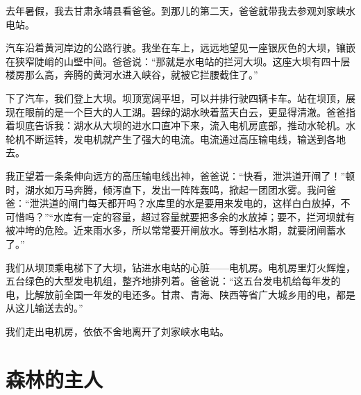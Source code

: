 \documentclass[12pt,UTF-8,openany]{ctexbook}
\begin{document}
\begin{large}
    
    去年暑假，我去甘肃永靖县看爸爸。到那儿的第二天，爸爸就带我去参观刘家峡水电站。
    
    汽车沿着黄河岸边的公路行驶。我坐在车上，远远地望见一座银灰色的大坝，镶嵌在狭窄陡峭的山壁中间。爸爸说：“那就是水电站的拦河大坝。这座大坝有四十层楼房那么高，奔腾的黄河水进入峡谷，就被它拦腰截住了。”
    
    下了汽车，我们登上大坝。坝顶宽阔平坦，可以并排行驶四辆卡车。站在坝顶，展现在眼前的是一个巨大的人工湖。碧绿的湖水映着蓝天白云，更显得清澈。爸爸指着坝底告诉我：湖水从大坝的进水口直冲下来，流入电机房底部，推动水轮机。水轮机不断运转，发电机就产生了强大的电流。电流通过高压输电线，输送到各地去。
    
    我正望着一条条伸向远方的高压输电线出神，爸爸说：“快看，泄洪道开闸了！”顿时，湖水如万马奔腾，倾泻直下，发出一阵阵轰鸣，掀起一团团水雾。我问爸爸：“泄洪道的闸门每天都开吗？水库里的水是要用来发电的，这样白白放掉，不可惜吗？”“水库有一定的容量，超过容量就要把多余的水放掉；要不，拦河坝就有被冲垮的危险。近来雨水多，所以常常要开闸放水。等到枯水期，就要闭闸蓄水了。”
    
    我们从坝顶乘电梯下了大坝，钻进水电站的心脏——电机房。电机房里灯火辉煌，五台绿色的大型发电机组，整齐地排列着。爸爸说：“这五台发电机给每年发的电，比解放前全国一年发的电还多。甘肃、青海、陕西等省广大城乡用的电，都是从这儿输送去的。”
    
    我们走出电机房，依依不舍地离开了刘家峡水电站。
    
\end{large}



\chapter{森林的主人}
\end{document}
